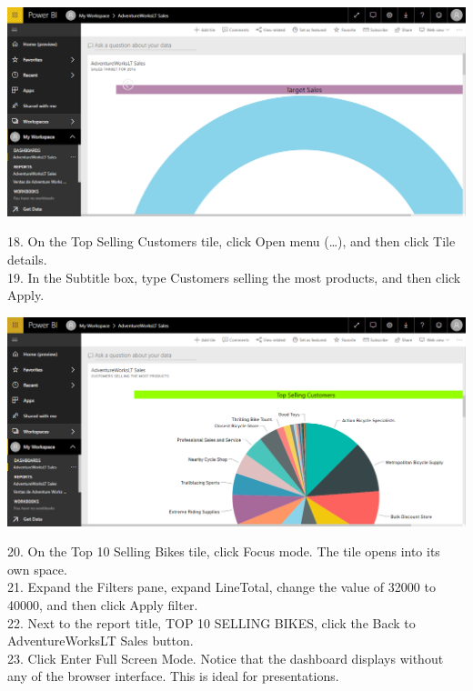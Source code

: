 	\begin{center}
	\includegraphics[width=17cm]{./Imagenes/Ejercicio3/Tarea2/11}
	\end{center}	

18. On the Top Selling Customers tile, click Open menu (…), and then click Tile details.\\
19. In the Subtitle box, type Customers selling the most products, and then click Apply.\\

	\begin{center}
	\includegraphics[width=17cm]{./Imagenes/Ejercicio3/Tarea2/12}
	\end{center}	

20. On the Top 10 Selling Bikes tile, click Focus mode. The tile opens into its own space.\\
21. Expand the Filters pane, expand LineTotal, change the value of 32000 to 40000, and then click Apply filter.\\
22. Next to the report title, TOP 10 SELLING BIKES, click the Back to AdventureWorksLT Sales button.\\
23. Click Enter Full Screen Mode. Notice that the dashboard displays without any of the browser
interface. This is ideal for presentations.\\


